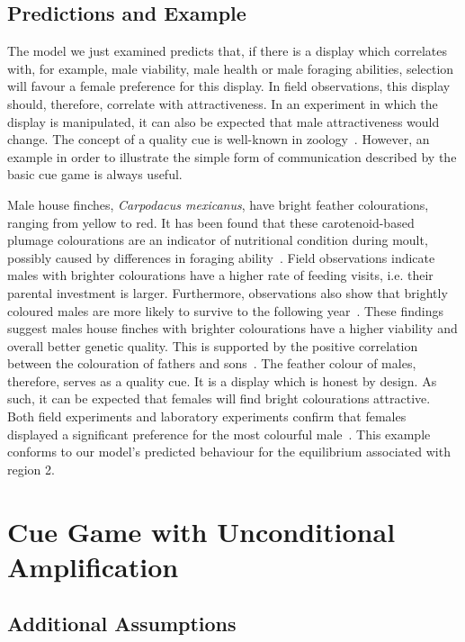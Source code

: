 \documentclass[a4paper,12pt]{article}
\numberwithin{equation}{section}
\begin{document}
\subsection{Predictions and Example}
\label{sec:Basic Cue Game/Example}

The model we just examined predicts that, if there is a display which correlates with, for example, male viability, male health or male foraging abilities, selection will favour a female preference for this display. In field observations, this display should, therefore, correlate with attractiveness. In an experiment in which the display is manipulated, it can also be expected that male attractiveness would change. The concept of a quality cue is well-known in zoology~\cite{Jennions1997}. However, an example in order to illustrate the simple form of communication described by the basic cue game is always useful.

Male house finches, \textit{Carpodacus mexicanus}, have bright feather colourations, ranging from yellow to red. It has been found that these carotenoid-based plumage colourations are an indicator of nutritional condition during moult, possibly caused by differences in foraging ability~\cite{Hill1994}. Field observations indicate males with brighter colourations have a higher rate of feeding visits, i.e. their parental investment is larger. Furthermore, observations also show that brightly coloured males are more likely to survive to the following year~\cite{Hill1991}. These findings suggest males house finches with brighter colourations have a higher viability and overall better genetic quality. This is supported by the positive correlation between the colouration of fathers and sons~\cite{Hill1991}. The feather colour of males, therefore, serves as a quality cue. It is a display which is honest by design. As such, it can be expected that females will find bright colourations attractive. Both field experiments and laboratory experiments confirm that females displayed a significant preference for the most colourful male~\cite{Hill1990, Hill1991}. This example conforms to our model's predicted behaviour for the equilibrium associated with region 2.

\newpage\clearpage


\section{Cue Game with Unconditional Amplification}
\label{sec:Cue Game with Unconditional Amplification}
\subsection{Additional Assumptions}
\label{sec:Cue Game with Unconditional Amplification/Additional Assumptions}
\end{document}
